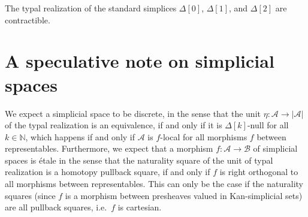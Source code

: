 \begin{cor}
The typal realization of the standard simplices $\Delta[0]$, $\Delta[1]$, and $\Delta[2]$ are contractible.
\end{cor}

\section{A speculative note on simplicial spaces}

We expect a simplicial space to be discrete, in the sense that the unit $\eta:\mathcal{A}\to |\mathcal{A}|$ of the typal realization is an equivalence, if and only if it is $\Delta[k]$-null for all $k\in\mathbb{N}$, which happens if and only if $\mathcal{A}$ is $f$-local for all morphisms $f$ between representables. Furthermore, we expect that a morphism $f:\mathcal{A}\to\mathcal{B}$ of simplicial spaces is \'etale in the sense that the naturality square of the unit of typal realization is a homotopy pullback square, if and only if $f$ is right orthogonal to all morphisms between representables. This can only be the case if the naturality squares (since $f$ is a morphism between presheaves valued in Kan-simplicial sets) are all pullback squares, i.e.~$f$ is cartesian. 
